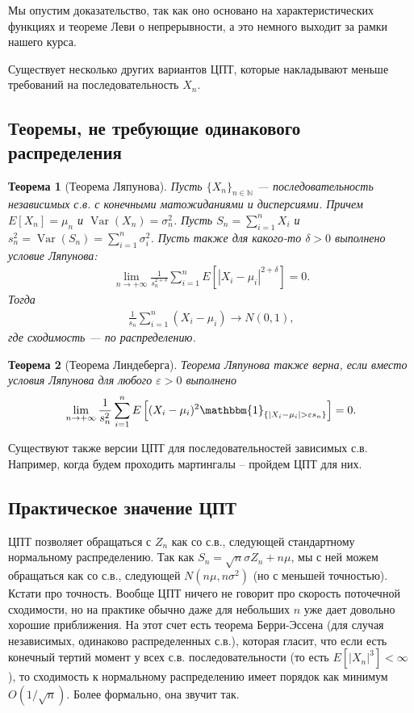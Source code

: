 \documentclass[12pt]{article}
\newcommand\N{\mathbb{N}}
\newcommand\eps{\varepsilon}
\newcommand\one{\mathbbm{1}}
\DeclareMathOperator{\Var}{Var}
\newtheorem{theorem}{Теорема}
\begin{document}
Мы опустим доказательство, так как оно основано на характеристических функциях и теореме Леви о непрерывности, а это немного выходит за рамки нашего курса. 

Существует несколько других вариантов ЦПТ, которые накладывают меньше требований на последовательность $X_n$. 


\subsection{Теоремы, не требующие одинакового распределения}
\begin{theorem}[Теорема Ляпунова]
  Пусть $\{X_n\}_{n \in \N}$ --- последовательность независимых с.в. с конечными матожиданиями и дисперсиями. Причем $E[X_n] = \mu_n$ и $\Var(X_n) = \sigma_n^2$. Пусть $S_n = \sum_{i = 1}^n X_i$ и $s_n^2 = \Var(S_n) = \sum_{i = 1}^n \sigma_i^2$. Пусть также для какого-то $\delta > 0$ выполнено условие Ляпунова:
  \begin{align*}
    \lim_{n \to +\infty} \frac{1}{s_n^{2 + \delta}} \sum_{i = 1}^n E\left[|X_i - \mu_i|^{2 + \delta}\right] = 0.
  \end{align*}
  Тогда
  \begin{align*}
    \frac{1}{s_n} \sum_{i = 1}^n (X_i - \mu_i) \to N(0, 1),
  \end{align*} 
  где сходимость --- по распределению.
\end{theorem}

\begin{theorem}[Теорема Линдеберга]
  Теорема Ляпунова также верна, если вместо условия Ляпунова для любого $\eps > 0$ выполнено
  \begin{align*}
    \lim_{n \to +\infty} \frac{1}{s_n^2} \sum_{i = 1}^n E\left[(X_i - \mu_i)^2 \one_{\{|X_i - \mu_i| > \eps s_n\}}\right] = 0.
  \end{align*}
\end{theorem}

Существуют также версии ЦПТ для последовательностей зависимых с.в. Например, когда будем проходить мартингалы -- пройдем ЦПТ для них.

\subsection{Практическое значение ЦПТ}

ЦПТ позволяет обращаться с $Z_n$ как со с.в., следующей стандартному нормальному распределению. Так как $S_n = \sqrt{n}\sigma Z_n + n\mu$, мы с ней можем обращаться как со с.в., следующей $N(n\mu, n\sigma^2)$ (но с меньшей точностью). Кстати про точность. Вообще ЦПТ ничего не говорит про скорость поточечной сходимости, но на практике обычно даже для небольших $n$ уже дает довольно хорошие приближения. На этот счет есть теорема Берри-Эссена (для случая независимых, одинаково распределенных с.в.), которая гласит, что если есть конечный тертий момент у всех с.в. последовательности (то есть $E[|X_n|^3] < \infty$), то сходимость к нормальному распределению имеет порядок как минимум $O(1/\sqrt{n})$. Более формально, она звучит так.
\end{document}
